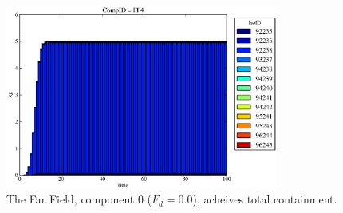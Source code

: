 \begin{frame}
\begin{figure}
\begin{minipage}[b]{0.45\linewidth}
  \includegraphics[width=0.8\textwidth]{./images/drIV0.eps}
  \caption[Case DRIII Waste Package Contaminants.]{ 
    The Far Field, component 0 ($F_d = 0.0$), acheives total containment.
    }
  \label{fig:drIVff0}


  \end{minipage}
\end{figure}
\end{frame}
